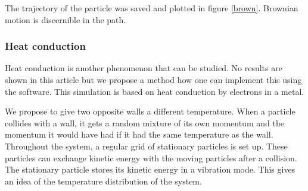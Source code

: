 
The trajectory of the particle was saved and plotted in figure \ref{brown}.  
Brownian motion is discernible in the path.

\subsubsection{Heat conduction}

Heat conduction is another phenomenon that can be studied. No results are shown 
in this article but we propose a method how one can implement this using the 
software. This simulation is based on heat conduction by electrons in a metal.

We propose to give two opposite walls a different temperature.  When a particle 
collides with a wall, it gets a random mixture of its own momentum and the 
momentum it would have had if it had the same temperature as the wall.  
Throughout the system, a regular grid of stationary particles is set up. These 
particles can exchange kinetic energy with the moving particles after a 
collision. The stationary particle stores its kinetic energy in a vibration 
mode. This gives an idea of the temperature distribution of the system.

